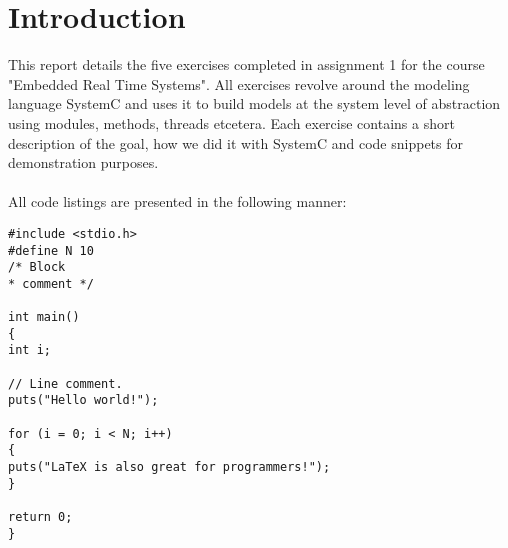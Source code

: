\section{Introduction}

This report details the five exercises completed in assignment 1 for the course "Embedded Real Time Systems". All exercises revolve around the modeling language SystemC and uses it to build models at the system level of abstraction using modules, methods, threads etcetera. Each exercise contains a short description of the goal, how we did it with SystemC and code snippets for demonstration purposes. \\\\
All code listings are presented in the following manner:
\begin{lstlisting}[style=customc++, caption=Example listing.]
#include <stdio.h>
#define N 10
/* Block
* comment */

int main()
{
int i;

// Line comment.
puts("Hello world!");

for (i = 0; i < N; i++)
{
puts("LaTeX is also great for programmers!");
}

return 0;
}
\end{lstlisting}